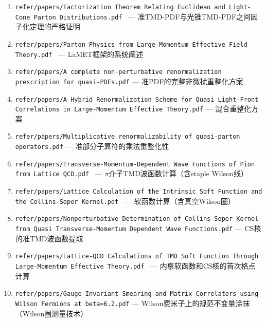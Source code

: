 \documentclass[12pt,a4paper]{ctexart}
\theoremstyle{definition}
\begin{document}
\begin{enumerate}[leftmargin=*,nosep]
    \item \texttt{refer/papers/Factorization Theorem Relating Euclidean and Light-Cone Parton Distributions.pdf}~\cite{Izubuchi2018} — 准TMD-PDF与光锥TMD-PDF之间因子化定理的严格证明
    \item \texttt{refer/papers/Parton Physics from Large-Momentum Effective Field Theory.pdf}~\cite{Ji2014LaMET} — LaMET框架的系统阐述
    \item \texttt{refer/papers/A complete non-perturbative renormalization prescription for quasi-PDFs.pdf} — 准PDF的完整非微扰重整化方案
    \item \texttt{refer/papers/A Hybrid Renormalization Scheme for Quasi Light-Front Correlations in Large-Momentum Effective Theory.pdf} — 混合重整化方案
    \item \texttt{refer/papers/Multiplicative renormalizability of quasi-parton operators.pdf} — 准部分子算符的乘法重整化性
    \item \texttt{refer/papers/Transverse-Momentum-Dependent Wave Functions of Pion from Lattice QCD.pdf}~\cite{Chu2023TMDWF} — $\pi$介子TMD波函数计算（含staple Wilson线）
    \item \texttt{refer/papers/Lattice Calculation of the Intrinsic Soft Function and the Collins-Soper Kernel.pdf}~\cite{Chu2023soft} — 软函数计算（含真空Wilson圈）
    \item \texttt{refer/papers/Nonperturbative Determination of Collins-Soper Kernel from Quasi Transverse-Momentum Dependent Wave Functions.pdf} — CS核的准TMD波函数提取
    \item \texttt{refer/papers/Lattice-QCD Calculations of TMD Soft Function Through Large-Momentum Effective Theory.pdf}~\cite{LPC2020soft} — 内禀软函数和CS核的首次格点计算
    \item \texttt{refer/papers/Gauge-Invariant Smearing and Matrix Correlators using Wilson Fermions at beta=6.2.pdf} — Wilson费米子上的规范不变量涂抹（Wilson圈测量技术）
\end{enumerate}
\end{document}
